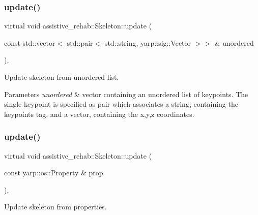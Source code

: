 \subsubsection{\texorpdfstring{update()}{update()}\hspace{0.1cm}{\footnotesize\ttfamily [2/3]}}
{\footnotesize\ttfamily virtual void assistive\+\_\+rehab\+::\+Skeleton\+::update (\begin{DoxyParamCaption}\item[{const std\+::vector$<$ std\+::pair$<$ std\+::string, yarp\+::sig\+::\+Vector $>$$>$ \&}]{unordered }\end{DoxyParamCaption})\hspace{0.3cm}{\ttfamily [virtual]}, {\ttfamily [inherited]}}



Update skeleton from unordered list. 


\begin{DoxyParams}{Parameters}
{\em unordered} & vector containing an unordered list of keypoints. The single keypoint is specified as pair which associates a string, containing the keypoint\textquotesingle{}s tag, and a vector, containing the x,y,z coordinates. \\
\hline
\end{DoxyParams}
\mbox{\label{classassistive__rehab_1_1Skeleton_ae3346b2f363e1812fdc88e59d1f7bf7d}} 
\subsubsection{\texorpdfstring{update()}{update()}\hspace{0.1cm}{\footnotesize\ttfamily [3/3]}}
{\footnotesize\ttfamily virtual void assistive\+\_\+rehab\+::\+Skeleton\+::update (\begin{DoxyParamCaption}\item[{const yarp\+::os\+::\+Property \&}]{prop }\end{DoxyParamCaption})\hspace{0.3cm}{\ttfamily [virtual]}, {\ttfamily [inherited]}}



Update skeleton from properties. 


